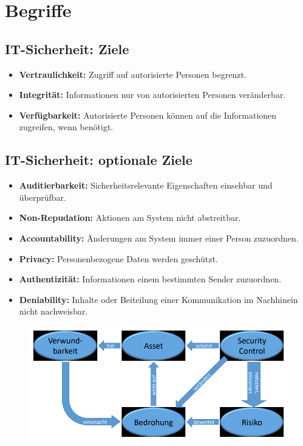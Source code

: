 \chapter{Begriffe}
\section{IT-Sicherheit: Ziele}
\begin{itemize}
	\item \textbf{Vertraulichkeit:} Zugriff auf autorisierte Personen begrenzt.
	\item \textbf{Integrität:} Informationen nur von autorisierten Personen veränderbar.
	\item \textbf{Verfügbarkeit:} Autorisierte Personen können auf die Informationen zugreifen, wenn benötigt.
\end{itemize}

\section{IT-Sicherheit: optionale Ziele}
\begin{itemize}
	\item \textbf{Auditierbarkeit:} Sicherheitsrelevante Eigenschaften einsehbar und überprüfbar.
	\item \textbf{Non-Repudation:} Aktionen am System nicht abstreitbar.
	\item \textbf{Accountability:} Änderungen am System immer einer Person zuzuordnen.
	\item \textbf{Privacy:} Personenbezogene Daten werden geschützt.
	\item \textbf{Authentizität:} Informationen einem bestimmten Sender zuzuordnen.
	\item \textbf{Deniability:} Inhalte oder Beiteilung einer Kommunikation im Nachhinein nicht nachweisbar.
\end{itemize}
\begin{figure}[H]
	\begin{center}
		\includegraphics[scale=0.5]{Resources/Grundbegriffe}
		\caption{}
		\label{fig:Grundbegriffe}
	\end{center}
\end{figure}

